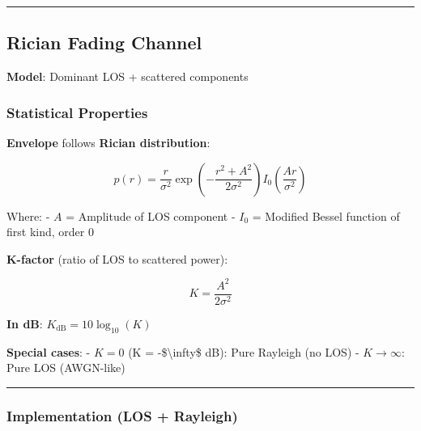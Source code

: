 \begin{center}\rule{0.5\linewidth}{0.5pt}\end{center}

\subsection{Rician Fading Channel}\label{rician-fading-channel}

\textbf{Model}: Dominant LOS + scattered components

\subsubsection{Statistical Properties}\label{statistical-properties-1}

\textbf{Envelope} follows \textbf{Rician distribution}:

\[
p(r) = \frac{r}{\sigma^2} \exp\left(-\frac{r^2 + A^2}{2\sigma^2}\right) I_0\left(\frac{Ar}{\sigma^2}\right)
\]

Where: - \(A\) = Amplitude of LOS component - \(I_0\) = Modified Bessel
function of first kind, order 0

\textbf{K-factor} (ratio of LOS to scattered power):

\[
K = \frac{A^2}{2\sigma^2}
\]

\textbf{In dB}: \(K_{\text{dB}} = 10\log_{10}(K)\)

\textbf{Special cases}: - \(K = 0\) (K = -\$\textbackslash infty\$ dB):
Pure Rayleigh (no LOS) - \(K \to \infty\): Pure LOS (AWGN-like)

\begin{center}\rule{0.5\linewidth}{0.5pt}\end{center}

\subsubsection{Implementation (LOS +
Rayleigh)}\label{implementation-los-rayleigh}

